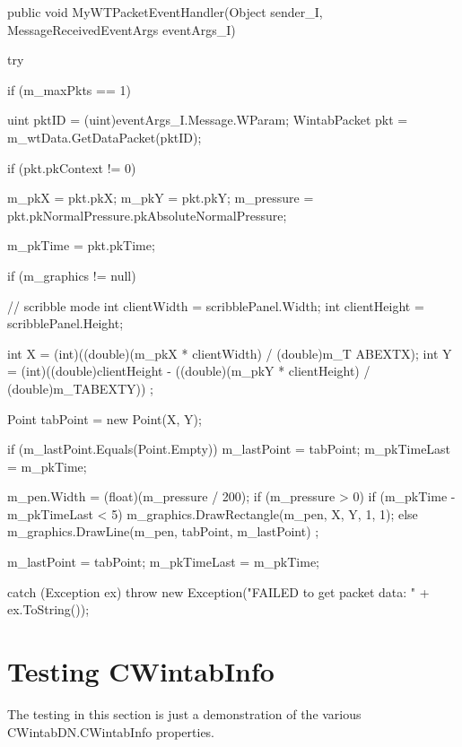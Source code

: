 \begin{DoxyCode}
    public void MyWTPacketEventHandler(Object sender_I, MessageReceivedEventArgs 
      eventArgs_I)
    {
        try
        {
            if (m_maxPkts == 1)
            {
                uint pktID = (uint)eventArgs_I.Message.WParam;
                WintabPacket pkt = m_wtData.GetDataPacket(pktID);

                if (pkt.pkContext != 0)
                {
                    m_pkX = pkt.pkX;
                    m_pkY = pkt.pkY;
                    m_pressure = pkt.pkNormalPressure.pkAbsoluteNormalPressure;

                    m_pkTime = pkt.pkTime;

                    if (m_graphics != null)
                    {
                        // scribble mode
                        int clientWidth = scribblePanel.Width;
                        int clientHeight = scribblePanel.Height;

                        int X = (int)((double)(m_pkX * clientWidth) / (double)m_T
      ABEXTX);
                        int Y = (int)((double)clientHeight - 
                            ((double)(m_pkY * clientHeight) / (double)m_TABEXTY))
      ;

                        Point tabPoint = new Point(X, Y);

                        if (m_lastPoint.Equals(Point.Empty))
                        {
                            m_lastPoint = tabPoint;
                            m_pkTimeLast = m_pkTime;
                        }

                        m_pen.Width = (float)(m_pressure / 200);
                        if (m_pressure > 0)
                        {
                            if (m_pkTime - m_pkTimeLast < 5)
                            {
                                m_graphics.DrawRectangle(m_pen, X, Y, 1, 1);
                            }
                            else
                            {
                                m_graphics.DrawLine(m_pen, tabPoint, m_lastPoint)
      ;
                            }
                        }

                        m_lastPoint = tabPoint;
                        m_pkTimeLast = m_pkTime;
                    }
                }
            }
        }
        catch (Exception ex)
        {
            throw new Exception("FAILED to get packet data: " + ex.ToString());
        }
    }
\end{DoxyCode}
\hypertarget{page2_testWTInfo_sec}{}\section{Testing CWintabInfo}\label{page2_testWTInfo_sec}
The testing in this section is just a demonstration of the various CWintabDN.CWintabInfo properties.

